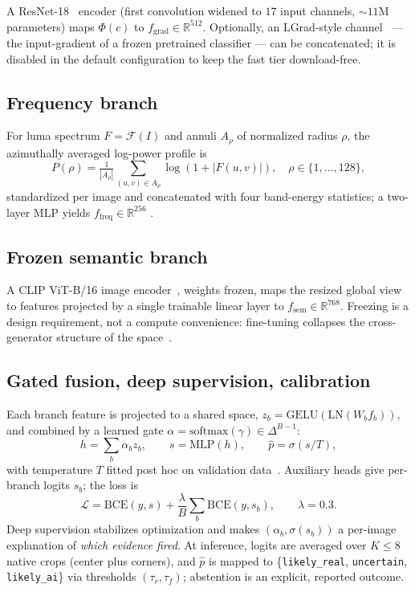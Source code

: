 \documentclass[10pt,twocolumn]{article}
\begin{document}
A ResNet-18~\cite{he2016resnet} encoder (first convolution widened to $17$
input channels, ${\sim}11$M parameters) maps $\Phi(c)$ to
$f_{\mathrm{grad}} \in \mathbb{R}^{512}$. Optionally, an LGrad-style
channel~\cite{tan2023lgrad} --- the input-gradient of a frozen pretrained
classifier --- can be concatenated; it is disabled in the default
configuration to keep the fast tier download-free.

\subsection{Frequency branch}
For luma spectrum $F = \mathcal{F}(I)$ and annuli $A_\rho$ of normalized
radius $\rho$, the azimuthally averaged log-power profile is
\begin{equation}
P(\rho) = \tfrac{1}{|A_\rho|}\!\!\sum_{(u,v)\in A_\rho}\!\!
\log\!\left(1+|F(u,v)|\right),\quad \rho \in \{1,\dots,128\},
\end{equation}
standardized per image and concatenated with four band-energy statistics; a
two-layer MLP yields $f_{\mathrm{freq}} \in \mathbb{R}^{256}$
\cite{durall2020watch,frank2020leveraging}.

\subsection{Frozen semantic branch}
A CLIP ViT-B/16 image encoder~\cite{radford2021clip}, weights frozen, maps
the resized global view to features projected by a single trainable
linear layer to $f_{\mathrm{sem}} \in \mathbb{R}^{768}$. Freezing is a design
requirement, not a compute convenience: fine-tuning collapses the
cross-generator structure of the space~\cite{ojha2023universal}.

\subsection{Gated fusion, deep supervision, calibration}
\label{sec:fusion}
Each branch feature is projected to a shared space,
$z_b = \mathrm{GELU}(\mathrm{LN}(W_b f_b))$, and combined by a learned gate
$\alpha = \mathrm{softmax}(\gamma) \in \Delta^{B-1}$:
\begin{equation}
h = \textstyle\sum_b \alpha_b z_b, \qquad
s = \mathrm{MLP}(h), \qquad
\hat p = \sigma(s/T),
\end{equation}
with temperature $T$ fitted post hoc on validation
data~\cite{guo2017calibration}. Auxiliary heads give per-branch logits $s_b$;
the loss is
\begin{equation}
\mathcal{L} = \mathrm{BCE}(y, s) + \frac{\lambda}{B}\sum_b \mathrm{BCE}(y, s_b),
\qquad \lambda = 0.3 .
\end{equation}
Deep supervision stabilizes optimization and makes $(\alpha_b, \sigma(s_b))$
a per-image explanation of \emph{which evidence fired}. At inference, logits
are averaged over $K \le 8$ native crops (center plus corners), and $\hat p$
is mapped to \{\texttt{likely\_real}, \texttt{uncertain},
\texttt{likely\_ai}\} via thresholds $(\tau_r, \tau_f)$; abstention is an
explicit, reported outcome.
\end{document}
